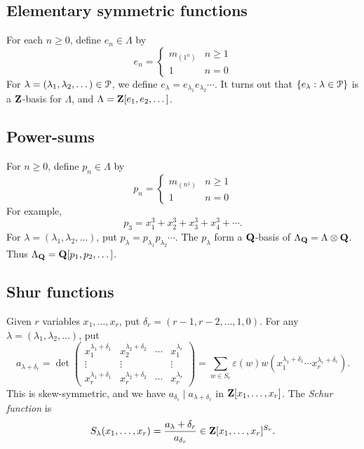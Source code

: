 \documentclass{article}
\begin{document}
\subsection{Elementary symmetric functions}

For each $n\geqslant 0$, define $e_n\in \Lambda$ by 
\[
  e_n = \begin{cases} m_{(1^n)} & n\geqslant 1 \\ 1 & n=0 \end{cases} 
\] 
For $\lambda=(\lambda_1,\lambda_2,\dots)\in \mathcal{P}$, we define 
$e_\lambda = e_{\lambda_1} e_{\lambda_2} \cdots$. It turns out that 
$\{e_\lambda:\lambda\in \mathcal{P}\}$ is a $\mathbf{Z}$-basis for $\Lambda$, and 
$\Lambda=\mathbf{Z}[e_1,e_2,\dots]$. 


\subsection{Power-sums}

For $n\geqslant 0$, define $p_n\in \Lambda$ by 
\[
  p_n = \begin{cases} m_{(n^1)} & n\geqslant 1 \\ 1 & n=0 \end{cases}
\]
For example, 
\[
  p_3 = x_1^3 + x_2^3 + x_3^3 + x_4^3 + \cdots .
\]
For $\lambda=(\lambda_1,\lambda_2,\dots)$, put 
$p_\lambda = p_{\lambda_1} p_{\lambda_2} \dotsm$. The $p_\lambda$ form 
a $\mathbf{Q}$-basis of $\Lambda_{\mathbf{Q}} = \Lambda\otimes \mathbf{Q}$. Thus 
$\Lambda_{\mathbf{Q}}=\mathbf{Q}[p_1,p_2,\dots]$. 


\subsection{Shur functions}

Given $r$ variables $x_1,\dots,x_r$, put $\delta_r = (r-1,r-2,\dots,1,0)$. For 
any $\lambda=(\lambda_1,\lambda_2,\dots)$, put 
\[
  a_{\lambda+\delta_r} = \det
  \begin{pmatrix}
    x_1^{\lambda_1+\delta_1} & x_2^{\lambda_2 + \delta_2} & \cdots & x_1^{\lambda_r} \\ 
    \vdots & \vdots & & \vdots \\ 
    x_r^{\lambda_1 + \delta_1} & x_r^{\lambda_2 + \delta_2} & \cdots & x_r^{\lambda_r}  
  \end{pmatrix}
  = \sum_{w\in S_r} \varepsilon(w) w(x_1^{\lambda_1+\delta_1} \dotsm x_r^{\lambda_r+\delta_r}) .
\]
This is skew-symmetric, and we have $a_{\delta_r} \mid a_{\lambda+\delta_r}$ in 
$\mathbf{Z}[x_1,\dots,x_r]$. The \emph{Schur function} is 
\begin{equation}\label{eq:schur-poly}
  S_\lambda(x_1,\dots,x_r) = \frac{a_\lambda+\delta_r}{a_{\delta_r}} \in \mathbf{Z}[x_1,\dots,x_r]^{S_r} .
\end{equation}
\end{document}
